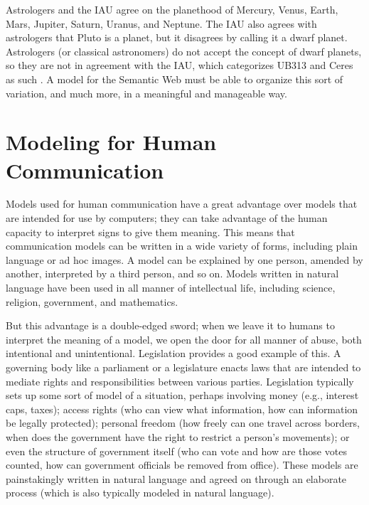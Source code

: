 Astrologers and the IAU agree on the planethood of Mercury, Venus,
Earth, Mars, Jupiter, Saturn,
Uranus, and Neptune. The IAU also agrees with astrologers that Pluto is
a planet, but it disagrees by calling it a dwarf planet. Astrologers (or
classical astronomers) do not accept the concept of dwarf planets, so
they are not in agreement with the IAU, which categorizes UB313 and
Ceres as such \cite{woolfolk2012only}. A model for the Semantic Web must be able to organize
this sort of variation, and much more, in a meaningful and manageable
way.

\section{Modeling for Human Communication}

Models used for human communication have a great advantage over models
that are intended for use by computers; they can take advantage of the
human capacity to interpret signs to give them meaning. This means that
communication models can be written in a wide variety of forms,
including plain language or ad hoc images. A model can be explained by
one person, amended by another, interpreted
by a third person, and so on. Models written in natural language have
been used in all manner of intellectual life, including science,
religion, government, and mathematics.

But this advantage is a double-edged sword; when we leave it to humans
to interpret the meaning of a model, we open the door for all manner of
abuse, both intentional and unintentional. Legislation provides a good
example of this. A governing body like a parliament or a legislature
enacts laws that are intended to mediate rights and responsibilities
between various parties. Legislation typically sets up some sort of
model of a situation, perhaps involving money (e.g., interest caps,
taxes); access rights (who can view what information, how can
information be legally protected); personal freedom (how freely can one
travel across borders, when does the government have the right to
restrict a person's movements); or even the structure of government
itself (who can vote and how are those votes counted, how can government
officials be removed from office). These models are painstakingly
written in natural language and agreed on through an elaborate process
(which is also typically modeled in natural language).

